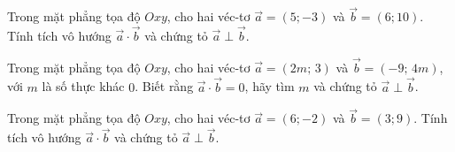 \begin{bt}%
	Trong mặt phẳng tọa độ $Oxy$, cho hai véc-tơ $\overrightarrow{a}=(5;-3)$ và $\overrightarrow{b}=(6;10)$. Tính tích vô hướng $\overrightarrow{a}\cdot \overrightarrow{b}$ và chứng tỏ $\overrightarrow{a}\perp\overrightarrow{b}$.
\end{bt}

\begin{bt}%
	Trong mặt phẳng tọa độ $Oxy$, cho hai véc-tơ $\overrightarrow{a}=(2m;\,3)$ và $\overrightarrow{b}=(-9;\,4m)$, với $m$ là số thực khác $0$. Biết rằng $\overrightarrow{a}\cdot\overrightarrow{b}=0$, hãy tìm $m$ và chứng tỏ $\overrightarrow{a}\perp\overrightarrow{b}$.
\end{bt}

\begin{bt}%
	Trong mặt phẳng tọa độ $Oxy$, cho hai véc-tơ $\overrightarrow{a}=(6;-2)$ và $\overrightarrow{b}=(3;9)$. Tính tích vô hướng $\overrightarrow{a}\cdot \overrightarrow{b}$ và chứng tỏ $\overrightarrow{a}\perp\overrightarrow{b}$.
\end{bt}

